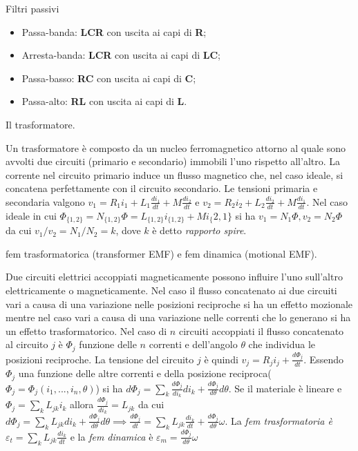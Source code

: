 \documentclass[answers, a4paper,12pt]{exam}
\begin{document}
\begin{questions}
\begin{solution}
	\end{solution}
	\question
	Filtri passivi
	\begin{solution}\begin{itemize}
			\item Passa-banda: \textbf{LCR} con uscita ai capi di \textbf{R};
			\item Arresta-banda: \textbf{LCR} con uscita ai capi di \textbf{LC};
			\item Passa-basso: \textbf{RC} con uscita ai capi di \textbf{C};
			\item Passa-alto: \textbf{RL} con uscita ai capi di \textbf{L}.
	\end{itemize}\end{solution}
	\question
	Il trasformatore.
	\begin{solution}
		Un trasformatore è composto da un nucleo ferromagnetico attorno al quale sono avvolti due circuiti (primario e secondario) immobili l'uno rispetto all'altro. La corrente nel circuito primario induce un flusso magnetico che, nel caso ideale, si concatena perfettamente con il circuito secondario. Le tensioni primaria e secondaria valgono $v_1 = R_1 i_1 + L_1 \frac{d i_1}{dt} + M \frac{d i_2}{dt}$ e $v_2 = R_2 i_2 + L_2 \frac{d i_2}{dt} + M \frac{d i_1}{dt}$. Nel caso ideale in cui $\Phi_{\{1,2\}} = N_{\{1,2\}} \Phi = L_{\{1,2\}} i_{\{1,2\}} + M i_\{2,1\}$ si ha $v_1 = N_1 \Phi, v_2 = N_2 \Phi$ da cui $v_1  / v_2 = N_1 / N_2 = k$, dove $k$ è detto \textit{rapporto spire}. 
	\end{solution}
	\question
	fem trasformatorica (transformer EMF) e fem dinamica (motional EMF).
	\begin{solution}
		Due circuiti elettrici accoppiati magneticamente possono influire l'uno sull'altro elettricamente o magneticamente. Nel caso il flusso concatenato ai due circuiti vari a causa di una variazione nelle posizioni reciproche si ha un effetto mozionale mentre nel caso vari a causa di una variazione nelle correnti che lo generano si ha un effetto trasformatorico. Nel caso di $n$ circuiti accoppiati il flusso concatenato al circuito $j$ è $\Phi_j$ funzione delle $n$ correnti e dell'angolo $\theta$ che individua le posizioni reciproche. La tensione del circuito $j$ è quindi $v_j = R_j i_j + \frac{d \Phi_j}{dt}$. Essendo $\Phi_j$ una funzione delle altre correnti e della posizione reciproca($\Phi_j = \Phi_j(i_1, ..., i_n, \theta)$) si ha $d \Phi_j = \sum_k \frac{d \Phi_j}{d i_k} d i_k + \frac{d \Phi_j}{d\theta} d\theta$. Se il materiale è lineare e $\Phi_j = \sum_k L_{jk} i_k$ allora $\frac{d \Phi_j}{d i_k} = L_{jk}$ da cui  $d \Phi_j = \sum_k L_{jk} d i_k + \frac{d \Phi_j}{d\theta} d\theta \implies \frac{d \Phi_j}{dt} = \sum_k L_{jk} \frac{d i_k}{dt} + \frac{d \Phi_j}{d\theta} \omega$. La \textit{fem trasformatoria è} $\varepsilon_t =  \sum_k L_{jk} \frac{d i_k}{dt}$ e la \textit{fem dinamica} è $\varepsilon_m = \frac{d \Phi_j}{d\theta} \omega$

\end{solution}
\end{questions}
\end{document}
